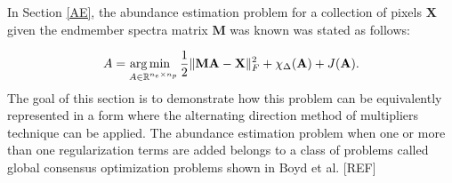 In Section \ref{AE}, the abundance estimation problem for a collection of pixels $\mathbf{X}$ given the endmember spectra matrix $\mathbf{M}$ was known was stated as follows:

\begin{equation*}
    A = \operatorname*{arg\,min \;\;}_{A \in \mathbb{R}^{n_e \times n_p}} \frac{1}{2}\|\mathbf{MA} - \mathbf{X}\|_F^2 + \chi_\Delta(\mathbf{A}) + J(\mathbf{A}).
\end{equation*}
The goal of this section is to demonstrate how this problem can be equivalently represented in a form where the alternating direction method of multipliers technique can be applied. The abundance estimation problem when one or more than one regularization terms are added belongs to a class of problems called global consensus optimization problems shown in Boyd et al. [REF]

